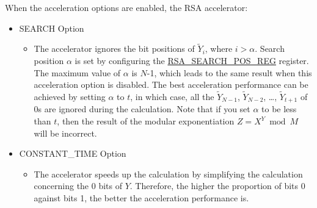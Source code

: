 \documentclass[main\_\_EN.tex]{subfiles}
\begin{document}
When the acceleration options are enabled, the RSA accelerator:

\begin{itemize}
\item SEARCH Option
    \begin{itemize}
        \item The accelerator ignores the bit positions of \begin{math} \widetilde{Y}_{i} \end{math}, where \begin{math} i > \alpha \end{math}. Search position \begin{math} \alpha \end{math} is set by configuring the \hyperref[regdesc:RSASEARCHPOSREG]{RSA\_SEARCH\_POS\_REG} register. The maximum value of \begin{math} \alpha \end{math} is \begin{math}N\end{math}-1, which leads to the same result when this acceleration option is disabled. The best acceleration performance can be achieved by setting \begin{math} \alpha \end{math} to \begin{math} t \end{math}, in which case, all the \begin{math}\widetilde{Y}_{N-1}\end{math}, \begin{math}\widetilde{Y}_{N-2}\end{math}, \dots, \begin{math}\widetilde{Y}_{t+1}\end{math} of 0s are ignored during the calculation. Note that if you set \begin{math} \alpha \end{math} to be less than \begin{math} t \end{math}, then the result of the modular exponentiation \begin{math}Z = X^{Y} \bmod M \end{math} will be incorrect.
    \end{itemize}
\item CONSTANT\_TIME Option
    \begin{itemize}
        \item The accelerator speeds up the calculation by simplifying the calculation concerning the 0 bits of \begin{math} Y \end{math}. Therefore, the higher the proportion of bits 0 against bits 1, the better the acceleration performance is.
    \end{itemize}
\end{itemize}
\end{document}
